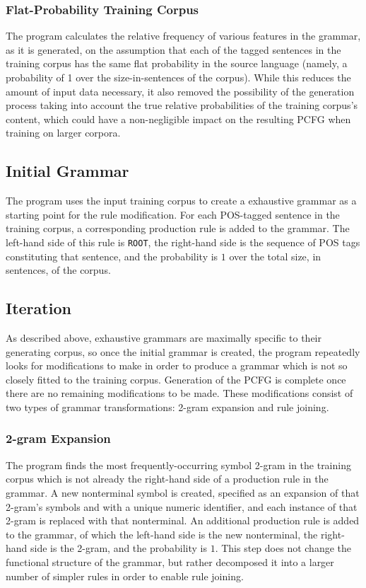 \documentclass[paper=a4, fontsize=11pt]{scrartcl} %
\numberwithin{equation}{section} %
\numberwithin{figure}{section} %
\numberwithin{table}{section} %
\begin{document}
\subsubsection{Flat-Probability Training Corpus}

The program calculates the relative frequency of various features in the grammar, as it is generated, on the assumption that each of the tagged sentences in the training corpus has the same flat probability in the source language (namely, a probability of 1 over the size-in-sentences of the corpus). While this reduces the amount of input data necessary, it also removed the possibility of the generation process taking into account the true relative probabilities of the training corpus's content, which could have a non-negligible impact on the resulting PCFG when training on larger corpora.

\subsection{Initial Grammar}

The program uses the input training corpus to create a exhaustive grammar as a starting point for the rule modification. For each POS-tagged sentence in the training corpus, a corresponding production rule is added to the grammar. The left-hand side of this rule is \texttt{ROOT}, the right-hand side is the sequence of POS tags constituting that sentence, and the probability is $1$ over the total size, in sentences, of the corpus.
\subsection{Iteration}

As described above, exhaustive grammars are maximally specific to their generating corpus, so once the initial grammar is created, the program repeatedly looks for modifications to make in order to produce a grammar which is not so closely fitted to the training corpus. Generation of the PCFG is complete once there are no remaining modifications to be made. These modifications consist of two types of grammar transformations: 2-gram expansion and rule joining.

\subsubsection{2-gram Expansion}

The program finds the most frequently-occurring symbol 2-gram in the training corpus which is not already the right-hand side of a production rule in the grammar. A new nonterminal symbol is created, specified as an expansion of that 2-gram's symbols and with a unique numeric identifier, and each instance of that 2-gram is replaced with that nonterminal. An additional production rule is added to the grammar, of which the left-hand side is the new nonterminal, the right-hand side is the 2-gram, and the probability is $1$. This step does not change the functional structure of the grammar, but rather decomposed it into a larger number of simpler rules in order to enable rule joining.
\end{document}
